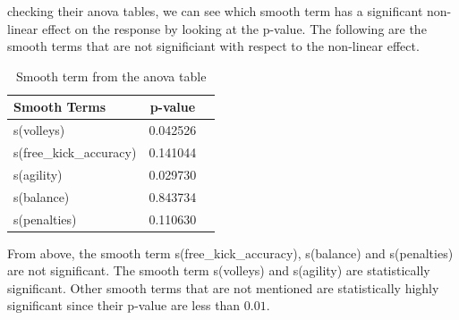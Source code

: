 \documentclass[11pt]{article}
\begin{document}
\noindent checking their anova tables, we can see which smooth term has a significant non-linear effect on the response by looking at the p-value. The following are the smooth terms that are not significiant with respect to the non-linear effect.\\
\begin{table}[h]
    \label{default_model}
    \centering
    \begin{tabular}{l c c}
        \hline
        \textbf{Smooth Terms} & \textbf{p-value}\\ \hline
        s(volleys) & 0.042526 \\
        s(free\_kick\_accuracy) & 0.141044 \\
        s(agility) & 0.029730\\
        s(balance) & 0.843734\\
        s(penalties) & 0.110630\\
        \hline
    \end{tabular}
    \caption{Smooth term from the anova table}
\end{table}

\noindent From above, the smooth term s(free\_kick\_accuracy), s(balance) and s(penalties) are not significant. The smooth term s(volleys) and s(agility) are statistically significant. Other smooth terms that are not mentioned are statistically highly significant since their p-value are less than $0.01$.




\newpage
\end{document}
